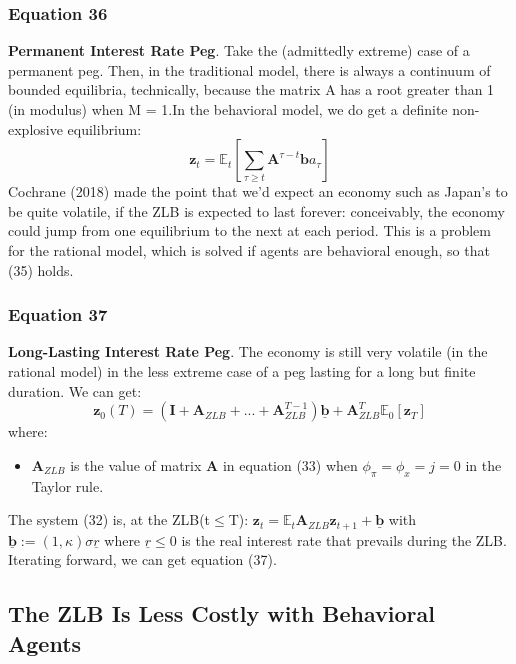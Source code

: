 \documentclass{article}
\begin{document}
\subsubsection*{Equation 36}
\textbf{Permanent Interest Rate Peg}. Take the (admittedly extreme) case of a permanent peg. Then, in the traditional model, there is always a continuum of bounded equilibria, technically, because the matrix A has a root greater than 1 (in
modulus) when M = 1.In the behavioral model, we do get a definite non-explosive equilibrium:
\begin{equation}\tag{36}
    \textbf{z}_{t}=\mathbb{E}_{t}\left[\sum_{\tau \geq t}\textbf{A}^{\tau-t}\textbf{b}a_{\tau}\right]
\end{equation}
Cochrane (2018) made the point that we’d expect an economy such as Japan’s to be quite volatile, if the ZLB is expected to last forever: conceivably, the economy could jump from one equilibrium to the next at each period. This is a problem for the rational model, which is solved if agents are behavioral enough, so that (35) holds.

\subsubsection*{Equation 37}
\textbf{Long-Lasting Interest Rate Peg}. The economy is still very volatile (in the rational model) in the less extreme case of a peg lasting for a long but finite duration. We can get:
\begin{equation} \tag{37}
    \textbf{z}_{0}(T)=\left(\textbf{I}+\textbf{A}_{ZLB}+...+\textbf{A}_{ZLB}^{T-1}\right)\underline{\textbf{b}}+\textbf{A}_{ZLB}^{T}\mathbb{E}_{0}\left[\textbf{z}_{T}\right]
\end{equation}
where:
\begin{itemize}
    \item $\textbf{A}_{ZLB}$ is the value of matrix $\textbf{A}$ in equation (33) when $\phi_{\pi}=\phi_{x}=j=0$ in the Taylor rule.
\end{itemize}
The system (32) is, at the ZLB(t$\leq$T): $\textbf{z}_{t}=\mathbb{E}_{t}\textbf{A}_{ZLB}\textbf{z}_{t+1}+\underline{\textbf{b}}$ with $\underline{\textbf{b}}:=\left(1,\kappa\right)\sigma\underline{r}$ where $\underline{r}\leq 0$ is the real interest rate that prevails during the ZLB. Iterating forward, we can get equation (37).

\subsection{The ZLB Is Less Costly with Behavioral Agents}
\end{document}
